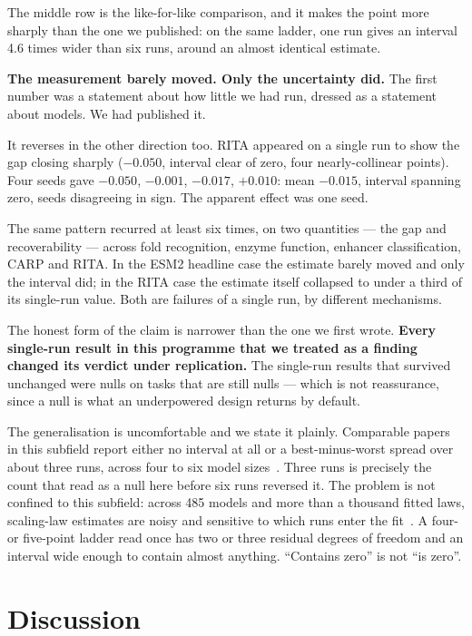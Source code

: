 \documentclass[11pt]{article}
\begin{document}
The middle row is the like-for-like comparison, and it makes the point more
sharply than the one we published: on the same ladder, one run gives an interval
4.6 times wider than six runs, around an almost identical estimate.

\textbf{The measurement barely moved. Only the uncertainty did.} The first number
was a statement about how little we had run, dressed as a statement about models.
We had published it.

It reverses in the other direction too. RITA appeared on a single run to show the
gap closing sharply ($-0.050$, interval clear of zero, four nearly-collinear
points). Four seeds gave $-0.050$, $-0.001$, $-0.017$, $+0.010$: mean $-0.015$,
interval spanning zero, seeds disagreeing in sign. The apparent effect was one
seed.

The same pattern recurred at least six times, on two quantities --- the gap and
recoverability --- across fold recognition, enzyme function, enhancer
classification, CARP and RITA. In the ESM2 headline case the estimate barely
moved and only the interval did; in the RITA case the estimate itself collapsed to
under a third of its single-run value. Both are failures of a single run, by
different mechanisms.

The honest form of the claim is narrower than the one we first wrote.
\textbf{Every single-run result in this programme that we treated as a finding
changed its verdict under replication.} The single-run results that survived
unchanged were nulls on tasks that are still nulls --- which is not reassurance,
since a null is what an underpowered design returns by default.

The generalisation is uncomfortable and we state it plainly. Comparable papers in
this subfield report either no interval at all or a best-minus-worst spread over
about three runs, across four to six model
sizes~\citep{gao2025pfmbench,xu2022peer,jamasb2024proteinworkshop}. Three runs is precisely the count that read as a null here before
six runs reversed it. The problem is not confined to this subfield: across 485
models and more than a thousand fitted laws, scaling-law estimates are noisy and
sensitive to which runs enter the fit~\citep{choshen2024hitchhiker}.
A four- or five-point ladder read once has two or three residual degrees of
freedom and an interval wide enough to contain almost anything. ``Contains zero''
is not ``is zero''.

\section{Discussion}
\end{document}
